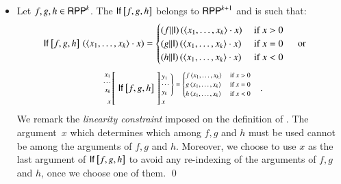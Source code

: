 \begin{definition}
\begin{itemize}
\item 
Let $ f, g, h\in\mathsf{RPP}^{k}$. 
The \rprIfName
 $ \mathsf{If}^{}_{}\left[f,g,h\right] $ belongs to $\mathsf{RPP}^{k+1}$ and is such that:
\begin{align*}
\mathsf{If}^{}_{}\left[f,g,h\right] \,  ( \langle x_1, \ldots, x_k \rangle \cdot x) & =  
\begin{cases}
(f \rVert \mathsf{I})\, ( \langle x_1, \ldots, x_k \rangle \cdot x) & \textrm{ if } x > 0\\
(g \rVert \mathsf{I})\, ( \langle x_1, \ldots, x_k \rangle \cdot x) & \textrm{ if } x = 0\\
(h \rVert \mathsf{I})\, ( \langle x_1, \ldots, x_k \rangle \cdot x) & \textrm{ if } x < 0
\end{cases}
\quad \textrm{ or  }
\end{align*}
\begin{align*}
\arraycolsep=1.4pt
\begin{array}{rcl}
 \left. {\scriptsize 
           \begin{array}{r}
             x_1\\ \cdots\\ x_k\\[1.5mm] x
           \end{array} 
         } \right[
 & \rprIf{}{}{f}{g}{h} &
 \left] {\scriptsize 
          \begin{array}{l}
           \!\!
           \left .
           \begin{array}{l}
            y_1\\ \cdots\\ y_k
           \end{array} 
           \right \} = 
              \begin{cases}
               f\,\langle x_1, \ldots, x_k \rangle & \textrm{ if } x > 0\\
               g\,\langle x_1, \ldots, x_k \rangle & \textrm{ if } x = 0\\
               h\,\langle x_1, \ldots, x_k \rangle & \textrm{ if } x < 0
              \end{cases}\\
              x
          \end{array} 
        } \right.
\end{array}
\enspace .
\end{align*}
We remark the \emph{linearity constraint} imposed on the definition of \rprIfName.
The argument~$x$ which determines which among $ f, g $ and $ h $ must be used
cannot be among the arguments of $ f, g $ and $ h $.
Moreover, we choose to use $ x $ as the last argument of $ \mathsf{If}^{}_{}\left[f,g,h\right] $ to avoid any 
re-indexing of the arguments of $ f, g $ and $ h $, once we choose one of them.
\qed
\end{itemize}
\end{definition}

